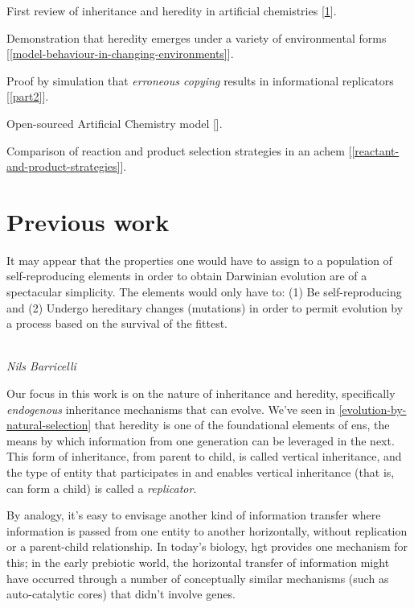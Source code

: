 \begin{compactenum}
\item First review of inheritance and heredity in artificial chemistries [\cref{previous-work}].
\item Demonstration that heredity emerges under a variety of environmental forms [\cref{model-behaviour-in-changing-environments}].
\item Proof by simulation that \emph{erroneous copying} \parencite{Zachar2010} results in informational replicators [\cref{part2}].
\item Open-sourced Artificial Chemistry model [\cite{toyworld}].
\item Comparison of reaction and product selection strategies in an \gls{achem} [\cref{reactant-and-product-strategies}].
\end{compactenum}

\chapter{Previous work}\label{previous-work}

\epigraph{%
It may appear that the properties one would have to assign to a population of self-reproducing elements in order to obtain Darwinian evolution are of a spectacular simplicity. The elements would only have to: (1) Be self-reproducing and (2) Undergo hereditary changes (mutations) in order to permit evolution by a process based on the survival of the fittest.}%
{\textit{\\Nils Barricelli}}

Our focus in this work is on the nature of inheritance and heredity, specifically \emph{endogenous} inheritance mechanisms that can evolve. We’ve seen in \cref{evolution-by-natural-selection} that heredity is one of the foundational elements of \gls{ens}, the means by which information from one generation can be leveraged in the next. This form of inheritance, from parent to child, is called vertical inheritance, and the type of entity that participates in and enables vertical inheritance (that is, can form a child) is called a \emph{replicator}. 

By analogy, it’s easy to envisage another kind of information transfer where information is passed from one entity to another horizontally, without replication or a parent-child relationship. In today’s biology, \gls{hgt} provides one mechanism for this; in the early prebiotic world, the horizontal transfer of information might have occurred through a number of conceptually similar mechanisms (such as auto-catalytic cores) that didn’t involve genes. 

